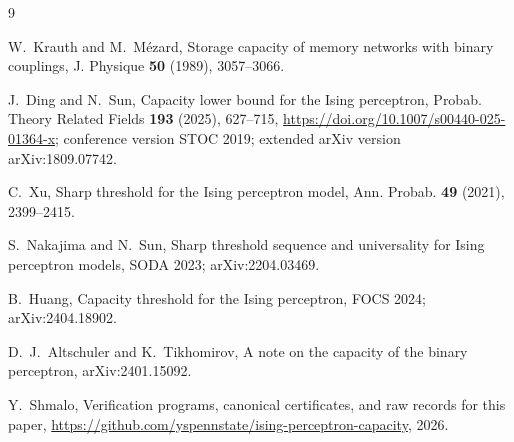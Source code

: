 \documentclass[11pt]{article}
\begin{document}
\begin{thebibliography}{9}

W.~Krauth and M.~M\'ezard,
Storage capacity of memory networks with binary couplings,
J. Physique \textbf{50} (1989), 3057--3066.

J.~Ding and N.~Sun,
Capacity lower bound for the Ising perceptron,
Probab. Theory Related Fields \textbf{193} (2025), 627--715,
\url{https://doi.org/10.1007/s00440-025-01364-x}; conference version STOC
2019; extended arXiv version arXiv:1809.07742.

C.~Xu,
Sharp threshold for the Ising perceptron model,
Ann. Probab. \textbf{49} (2021), 2399--2415.

S.~Nakajima and N.~Sun,
Sharp threshold sequence and universality for Ising perceptron models,
SODA 2023; arXiv:2204.03469.

B.~Huang,
Capacity threshold for the Ising perceptron,
FOCS 2024; arXiv:2404.18902.

D.~J.~Altschuler and K.~Tikhomirov,
A note on the capacity of the binary perceptron,
arXiv:2401.15092.

Y.~Shmalo,
Verification programs, canonical certificates, and raw records for this paper,
\url{https://github.com/yspennstate/ising-perceptron-capacity}, 2026.

\end{thebibliography}
\end{document}
